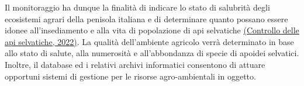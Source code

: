 \documentclass[main.tex]{subfiles}
\begin{document}
Il monitoraggio ha dunque la finalità di indicare lo stato di salubrità degli ecosistemi agrari della penisola italiana e di determinare quanto possano essere idonee all’insediamento e alla vita di popolazione di api selvatiche \href{https://beenet.crea.gov.it/2022/03/16/perche-bisogna-controllare-le-api-selvatiche/}{(Controllo delle
api selvatiche, 2022)}. La qualità dell’ambiente agricolo verrà determinato in base allo stato di salute, alla numerosità e all’abbondanza di specie di apoidei selvatici. Inoltre, il database ed i relativi archivi informatici consentono di attuare opportuni sistemi di gestione per le risorse agro-ambientali in oggetto.
\end{document}
